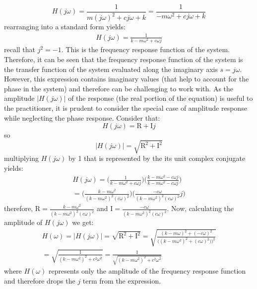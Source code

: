\documentclass[12pt,letter]{article}
\numberwithin{ex}{section} %
\numberwithin{re}{section} %
\begin{document}
\begin{equation}
H(j\omega) = \frac{1}{m(j\omega)^2+cj\omega+k} = \frac{1}{-m\omega^2+cj\omega+k} 
\end{equation}
rearranging into a standard form yields:
\begin{eqnarray}
H(j\omega) = \frac{1}{k-m\omega^2+c\omega j}
\label{eq:frequency_response_function}
\end{eqnarray}
recall that $j^2=-1$. This is the frequency response function of the system. Therefore, it can be seen that the frequency response function of the system is the transfer function of the system evaluated along the imaginary axis $s=j\omega$. However, this expression contains imaginary values (that help to account for the phase in the system) and therefore can be challenging to work with. As the amplitude $|H(j\omega)|$ of the response (the real portion of the equation) is useful to the practitioner, it is prudent to consider the special case of amplitude response while neglecting the phase response. Consider that:
\begin{equation}
	H(j\omega) = \text{R}+\text{I}j
\end{equation}  
so
\begin{equation}
	 |H(j\omega)|=\sqrt{\text{R}^2+\text{I}^2}
\end{equation}  
multiplying $H(j\omega)$ by 1 that is represented by the its unit complex conjugate yields:
\begin{multline}
	 H(j\omega) = \bigg( \frac{1}{k-m\omega^2+c\omega j} \bigg) \bigg( \frac{k-m\omega^2-c\omega j}{k-m\omega^2-c\omega j}\bigg) \\ =  \bigg( \frac{k-m\omega^2}{(k-m\omega^2)^2(c\omega)^2} \bigg) \bigg( \frac{-c\omega}{(k-m\omega^2)^2(c\omega)^2}j\bigg) 
\end{multline}  
therefore, $\text{R} = \frac{k-m\omega^2}{(k-m\omega^2)^2(c\omega)^2} $ and $\text{I} = \frac{-c\omega}{(k-m\omega^2)^2(c\omega)^2}$. Now, calculating the amplitude of $H(j\omega)$ we get:
\begin{multline}
H(\omega) = |H(j\omega)| = \sqrt{\text{R}^2+\text{I}^2} =  \sqrt{\frac{(k-m\omega)^2+(-c\omega)^2}{\big((k-m\omega^2)^2+(c\omega)^2)\big)^2}} \\ 
= \sqrt{\frac{1}{(k-m\omega^2)^2+c^2\omega^2}} = \frac{1}{\sqrt{(k-m\omega^2)^2+c^2\omega^2}}
\end{multline}
where $H(\omega)$ represents only the amplitude of the frequency response function and therefore drops the $j$ term from the expression. 
\end{document}
